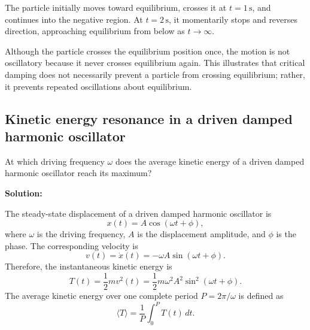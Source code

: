 \documentclass[12pt]{article}
\begin{document}
The particle initially moves toward equilibrium, crosses it
at $t=1\,\mathrm{s}$, and continues into the negative region.
At $t=2\,\mathrm{s}$, it momentarily stops and reverses direction,
approaching equilibrium from below as $t\to\infty$.

Although the particle crosses the equilibrium position once,
the motion is not oscillatory because it never crosses
equilibrium again. This illustrates that critical damping
does not necessarily prevent a particle from crossing
equilibrium; rather, it prevents repeated oscillations
about equilibrium.

\subsection{Kinetic energy resonance in a driven damped harmonic oscillator}

At which driving frequency $\omega$ does the average kinetic energy
of a driven damped harmonic oscillator reach its maximum?

\textbf{Solution:}

The steady-state displacement of a driven damped harmonic oscillator is
\begin{equation}
    x(t)=A\cos(\omega t+\phi),
\end{equation}
where $\omega$ is the driving frequency, $A$ is the displacement amplitude, and $\phi$ is the phase. The corresponding velocity is
\begin{equation}
    v(t)=\dot{x}(t)=-\omega A\sin(\omega t+\phi).
\end{equation}
Therefore, the instantaneous kinetic energy is
\begin{equation}
    T(t)=\frac{1}{2}mv^2(t)
    =\frac{1}{2}m\omega^2A^2\sin^2(\omega t+\phi).
\end{equation}
The average kinetic energy over one complete period $P=2\pi/\omega$ is defined as
\begin{equation}
    \langle T\rangle
    =\frac{1}{P}\int_0^P T(t)\,dt.
\end{equation}
\end{document}
